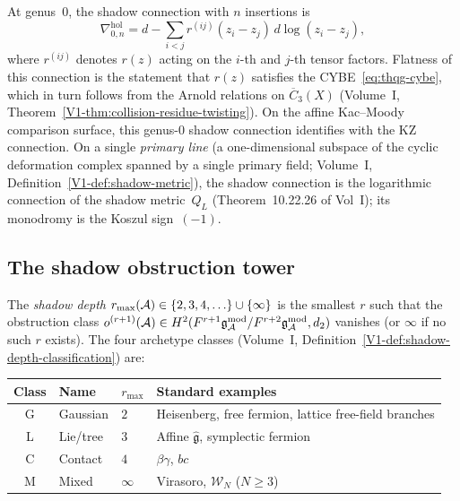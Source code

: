 \begin{remark}
At genus~$0$, the shadow connection with $n$ insertions is
\begin{equation}%
\nabla^{\mathrm{hol}}_{0,n}
= d - \sum_{i<j} r^{(ij)}(z_i - z_j)\, d\log(z_i - z_j),
\end{equation}
where $r^{(ij)}$ denotes $r(z)$ acting on the $i$-th and $j$-th
tensor factors. Flatness of this connection is the statement that
$r(z)$ satisfies the CYBE~\eqref{eq:thqg-cybe}, which in turn
follows from the Arnold relations on $\overline{C}_3(X)$
(Volume~I, Theorem~\ref{V1-thm:collision-residue-twisting}).
On the affine Kac--Moody comparison surface, this genus-$0$
shadow connection identifies with the KZ connection.
On a single \emph{primary line} (a one-dimensional
subspace of the cyclic deformation complex spanned by a
single primary field; Volume~I,
Definition~\ref{V1-def:shadow-metric}), the shadow connection
is the logarithmic
connection of the shadow metric~$Q_L$
(Theorem~10.22.26 of Vol~I); its monodromy
is the Koszul sign~$(-1)$.
\end{remark}


\subsection{The shadow obstruction tower}

\begin{definition}
\label{def:thqg-shadow-archetype}
The \emph{shadow depth} $r_{\max}(\mathcal{A}) \in \{2,3,4,\ldots\} \cup \{\infty\}$ is
the smallest $r$ such that the obstruction class
$o^{(r+1)}(\mathcal{A}) \in H^2(F^{r+1}\mathfrak{g}_{\mathcal{A}}^{\mathrm{mod}} / F^{r+2}\mathfrak{g}_{\mathcal{A}}^{\mathrm{mod}}, d_2)$ vanishes
(or $\infty$ if no such $r$ exists). The four archetype classes
(Volume~I, Definition~\ref{V1-def:shadow-depth-classification}) are:
\begin{center}
\renewcommand{\arraystretch}{1.2}
\small
\begin{tabular}{clll}
\textbf{Class} & \textbf{Name} & $r_{\max}$ & \textbf{Standard examples} \\
\hline
G & Gaussian & $2$ & Heisenberg, free fermion, lattice free-field branches \\
L & Lie/tree & $3$ & Affine $\widehat{\mathfrak{g}}$, symplectic fermion \\
C & Contact & $4$ & $\beta\gamma$, $bc$ \\
M & Mixed & $\infty$ & Virasoro, $\mathcal{W}_N$ ($N \ge 3$)
\end{tabular}
\end{center}
\end{definition}

